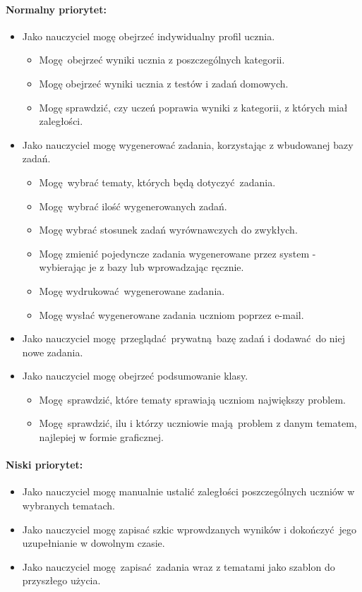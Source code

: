 \documentclass[polish,12pt]{aghthesis}
\begin{document}
\paragraph{Normalny priorytet:}
\begin{itemize}
	\item Jako nauczyciel mogę obejrzeć indywidualny profil ucznia.
	\begin{itemize}
		\item Mogę obejrzeć wyniki ucznia z poszczególnych kategorii.
		\item Mogę obejrzeć wyniki ucznia z testów i zadań domowych.
		\item Mogę sprawdzić, czy uczeń poprawia wyniki z kategorii, z których miał zaległości.
	\end{itemize}
	\item Jako nauczyciel mogę wygenerować zadania, korzystając z wbudowanej bazy zadań.
	\begin{itemize}
		\item Mogę wybrać tematy, których będą dotyczyć zadania.
		\item Mogę wybrać ilość wygenerowanych zadań.
		\item Mogę wybrać stosunek zadań wyrównawczych do zwykłych.
		\item Mogę zmienić pojedyncze zadania wygenerowane przez system - wybierając je z bazy lub wprowadzając ręcznie.
		\item Mogę wydrukować wygenerowane zadania.
		\item Mogę wysłać wygenerowane zadania uczniom poprzez e-mail.
	\end{itemize}
	\item Jako nauczyciel mogę przeglądać prywatną bazę zadań i dodawać do niej nowe zadania.
	\item Jako nauczyciel mogę obejrzeć podsumowanie klasy.
	\begin{itemize}
		\item Mogę sprawdzić, które tematy sprawiają uczniom największy problem.
		\item Mogę sprawdzić, ilu i którzy uczniowie mają problem z danym tematem, najlepiej w formie graficznej.
	\end{itemize}
\end{itemize}

\paragraph{Niski priorytet:}
\begin{itemize}
	\item Jako nauczyciel mogę manualnie ustalić zaległości poszczególnych uczniów w wybranych tematach.
	\item Jako nauczyciel mogę zapisać szkic wprowdzanych wyników i dokończyć jego uzupełnianie w dowolnym czasie.
	\item Jako nauczyciel mogę zapisać zadania wraz z tematami jako szablon do przyszłego użycia.
\end{itemize}
\end{document}
